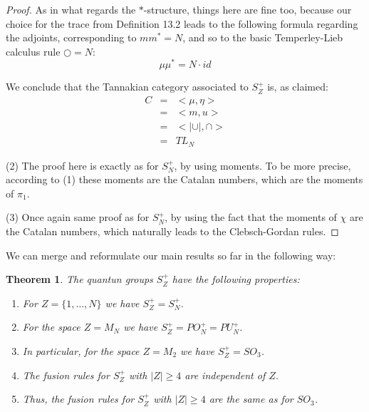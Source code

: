 \documentclass[12pt]{amsbook}
\newtheorem{theorem}{Theorem}[chapter]
\begin{document}
\begin{proof}
As in what regards the $*$-structure, things here are fine too, because our choice for the trace from Definition 13.2 leads to the following formula regarding the adjoints, corresponding to $mm^*=N$, and so to the basic Temperley-Lieb calculus rule $\bigcirc=N$:
$$\mu\mu^*=N\cdot id$$

We conclude that the Tannakian category associated to $S_Z^+$ is, as claimed:
\begin{eqnarray*}
C
&=&<\mu,\eta>\\
&=&<m,u>\\
&=&<|\cup|,\cap>\\
&=&TL_N
\end{eqnarray*}

(2) The proof here is exactly as for $S_N^+$, by using moments. To be more precise, according to (1) these moments are the Catalan numbers, which are the moments of $\pi_1$.

\medskip

(3) Once again same proof as for $S_N^+$, by using the fact that the moments of $\chi$ are the Catalan numbers, which naturally leads to the Clebsch-Gordan rules.
\end{proof}

We can merge and reformulate our main results so far in the following way:

\begin{theorem}
The quantun groups $S_Z^+$ have the following properties: 
\begin{enumerate}
\item For $Z=\{1,\ldots,N\}$ we have $S_Z^+=S_N^+$.

\item For the space $Z=M_N$ we have $S_Z^+=PO_N^+=PU_N^+$.

\item In particular, for the space $Z=M_2$ we have $S_Z^+=SO_3$.

\item The fusion rules for $S_Z^+$ with $|Z|\geq4$ are independent of $Z$.

\item Thus, the fusion rules for $S_Z^+$ with $|Z|\geq4$ are the same as for $SO_3$.
\end{enumerate}
\end{theorem}
\end{document}
